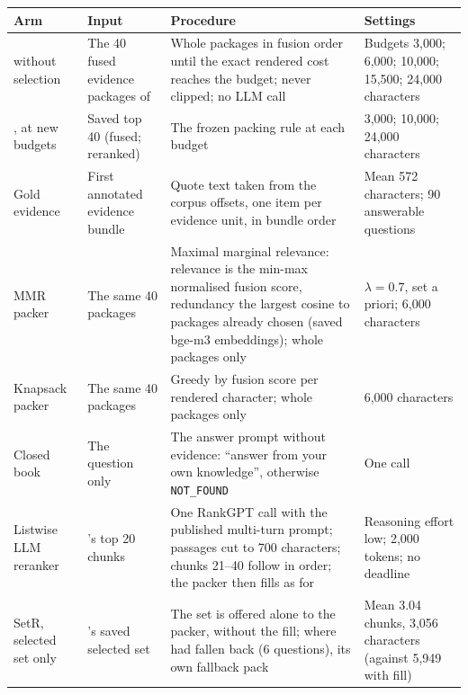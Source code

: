 \begin{table}[t]
\centering
\scriptsize
\setlength{\tabcolsep}{4pt}
\begin{tabularx}{\textwidth}{@{}p{2.6cm}p{2.9cm}Xp{2.8cm}@{}}
\toprule
Arm & Input & Procedure & Settings \\
\midrule
\lexb{} without selection & The 40 fused evidence packages of \lexb{} & Whole packages in fusion order until the exact rendered cost reaches the budget; never clipped; no LLM call & Budgets 3,000; 6,000; 10,000; 15,500; 24,000 characters \\
\hybrid{}, \hr{} at new budgets & Saved top 40 (fused; reranked) & The frozen packing rule at each budget & 3,000; 10,000; 24,000 characters \\
Gold evidence & First annotated evidence bundle & Quote text taken from the corpus offsets, one item per evidence unit, in bundle order & Mean 572 characters; 90 answerable questions \\
MMR packer & The same 40 packages & Maximal marginal relevance: relevance is the min-max normalised fusion score, redundancy the largest cosine to packages already chosen (saved bge-m3 embeddings); whole packages only & $\lambda=0.7$, set a priori; 6,000 characters \\
Knapsack packer & The same 40 packages & Greedy by fusion score per rendered character; whole packages only & 6,000 characters \\
Closed book & The question only & The answer prompt without evidence: ``answer from your own knowledge'', otherwise \texttt{NOT\_FOUND} & One call \\
Listwise LLM reranker & \hybrid{}'s top 20 chunks & One RankGPT call with the published multi-turn prompt; passages cut to 700 characters; chunks 21--40 follow in \hybrid{} order; the packer then fills as for \hybrid{} & Reasoning effort low; 2,000 tokens; no deadline \\
SetR, selected set only & \setr{}'s saved selected set & The set is offered alone to the packer, without the \hybrid{} fill; where \setr{} had fallen back (6 questions), its own fallback pack & Mean 3.04 chunks, 3,056 characters (against 5,949 with fill) \\

\end{tabularx}
\end{table}
